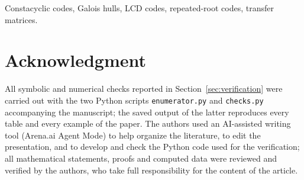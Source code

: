 \documentclass[journal]{IEEEtran}
\theoremstyle{definition}
\theoremstyle{remark}
\begin{document}
\begin{abstract}
We determine the exact joint distribution of the code dimension and the
$k$-Galois hull dimension over all repeated-root constacyclic codes of a fixed
length over a square-free affine algebra over a finite field. With length
$n=n'p^{t}$ and component moduli that are $p^{t}$-th powers of square-free
kernels, a code is encoded by one exponent at each distinct kernel factor, and
the $k$-Galois dual acts on those factors through a Frobenius-twisted
reciprocal permutation. On each orbit of this permutation the hull dimension is
a cyclic sum of pairwise minima of consecutive exponents, so its bivariate law
is the trace of a power of an explicit weighted transfer matrix with
$p^{t}+1$ states; multiplying over orbits, with a dimension-only factor for
components whose twist is incompatible, gives a bivariate polynomial whose
coefficients are the exact multiplicities of the pairs (code dimension, hull
dimension). We obtain the marginal laws, the attainable pairs, closed
means and variances, conditional laws, and the numbers of LCD,
self-orthogonal, dual-containing and self-dual codes, and we give an algorithm
that is polynomial in the length, the multiplicity and the number of kernel
factors, checked against finite-field computations in characteristics
$2$, $3$ and $5$.
\end{abstract}

\begin{IEEEkeywords}
Constacyclic codes, Galois hulls, LCD codes, repeated-root codes, transfer
matrices.
\end{IEEEkeywords}



\section*{Acknowledgment}
All symbolic and numerical checks reported in Section~\ref{sec:verification}
were carried out with the two Python scripts \texttt{enumerator.py} and
\texttt{checks.py} accompanying the manuscript; the saved output of the latter
reproduces every table and every example of the paper.
The authors used an AI-assisted writing tool (Arena.ai Agent Mode) to help
organize the literature, to edit the presentation, and to develop and check the
Python code used for the verification; all mathematical statements, proofs and
computed data were reviewed and verified by the authors, who take full
responsibility for the content of the article.



\end{document}
